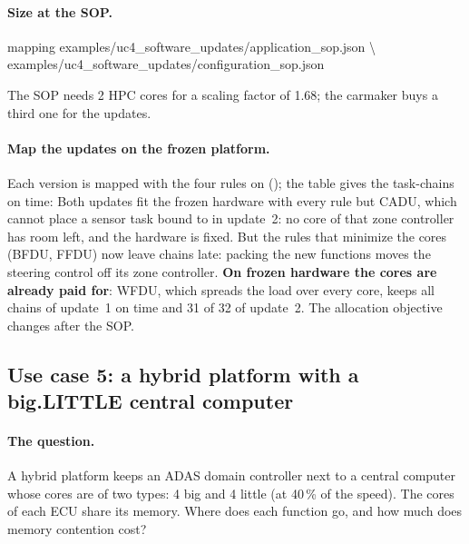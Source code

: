 \paragraph{Size at the SOP.}
\begin{shell}
mapping examples/uc4\_software\_updates/application\_sop.json \textbackslash\\
\quad examples/uc4\_software\_updates/configuration\_sop.json
\end{shell}
The SOP needs 2 HPC cores for a scaling factor of 1.68; the carmaker buys
a third one for the updates.

\paragraph{Map the updates on the frozen platform.} Each version is
mapped with the four rules on 
(); the table gives the task-chains on time:
Both updates fit the frozen hardware with every rule but CADU, which
cannot place a sensor task bound to  in update~2: no core of
that zone controller has room left, and the hardware is fixed. But the
rules that minimize the cores (BFDU, FFDU) now leave chains late:
packing the new functions moves the steering control off its zone
controller. \textbf{On frozen hardware the cores are already paid for}:
WFDU, which spreads the load over every core, keeps all chains of update~1
on time and 31 of 32 of update~2. The allocation objective changes after
the SOP.

\subsection{Use case 5: a hybrid platform with a big.LITTLE central computer}
\label{sec:uc5}

\paragraph{The question.} A hybrid platform keeps an ADAS domain
controller next to a central computer whose cores are of two types: 4
big and 4 little (at 40\,\% of the speed). The cores of each ECU share its
memory. Where does each function go, and how much does memory contention
cost?

